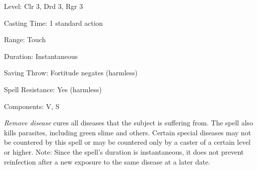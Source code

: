 
\begin{description*}
\item[Level:] Clr 3, Drd 3, Rgr 3
\item[Casting Time:] 1 standard action
\item[Range:] Touch
\item[Duration:] Instantaneous
\item[Saving Throw:] Fortitude negates (harmless)
\item[Spell Resistance:] Yes (harmless)
\item[Components:] V, S
\end{description*}

\textit{Remove disease} cures all diseases that the subject is suffering from.
The spell also kills parasites, including green slime and others. Certain special
diseases may not be countered by this spell or may be countered only by a caster
of a certain level or higher.
Note: Since the spell's duration is instantaneous, it does not prevent
reinfection after a new exposure to the same disease at a later date.